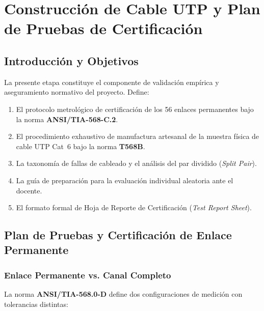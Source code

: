\chapter{Construcción de Cable UTP y Plan de Pruebas de Certificación}

\section{Introducción y Objetivos}

La presente etapa constituye el componente de validación empírica y aseguramiento normativo del proyecto. Define:

\begin{enumerate}[leftmargin=*, label=\arabic*.]
    \item El protocolo metrológico de certificación de los 56 enlaces permanentes bajo la norma \textbf{ANSI/TIA-568-C.2}.
    \item El procedimiento exhaustivo de manufactura artesanal de la muestra física de cable UTP Cat~6 bajo la norma \textbf{T568B}.
    \item La taxonomía de fallas de cableado y el análisis del par dividido (\textit{Split Pair}).
    \item La guía de preparación para la evaluación individual aleatoria ante el docente.
    \item El formato formal de Hoja de Reporte de Certificación (\textit{Test Report Sheet}).
\end{enumerate}

\section{Plan de Pruebas y Certificación de Enlace Permanente}

\subsection{Enlace Permanente vs. Canal Completo}

La norma \textbf{ANSI/TIA-568.0-D} define dos configuraciones de medición con tolerancias distintas:


